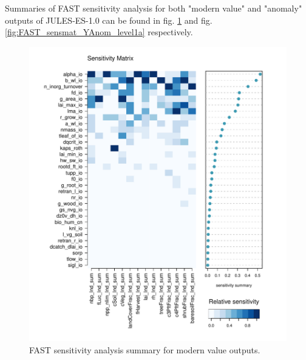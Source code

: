 \documentclass[gmd, manuscript]{copernicus}
\begin{document}
Summaries of FAST sensitivity analysis for both "modern value" and "anomaly" outputs of JULES-ES-1.0 can be found in fig. \ref{fig:FAST_sensmat_Y_level1a} and fig. \ref{fig:FAST_sensmat_YAnom_level1a} respectively.

\begin{figure}[t]
\includegraphics[width=12cm]{./figs/figA05.pdf}
\caption{FAST sensitivity analysis summary for modern value outputs.}
\label{fig:FAST_sensmat_Y_level1a}
\end{figure}
\end{document}
